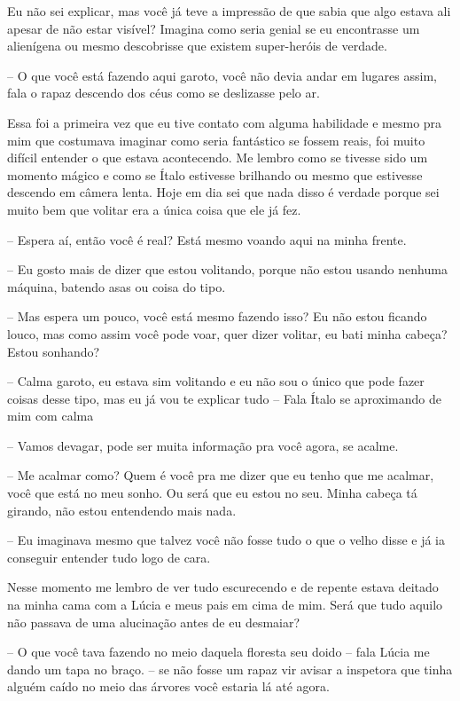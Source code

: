 Eu não sei explicar, mas você já teve a impressão de que sabia que algo estava ali apesar de não estar visível? Imagina como seria genial se eu encontrasse um alienígena ou mesmo descobrisse que existem super-heróis de verdade.

-- O que você está fazendo aqui garoto, você não devia andar em lugares assim, fala o rapaz descendo dos céus como se deslizasse pelo ar.

Essa foi a primeira vez que eu tive contato com alguma habilidade e mesmo pra mim que costumava imaginar como seria fantástico se fossem reais, foi muito difícil entender o que estava acontecendo. Me lembro como se tivesse sido um momento mágico e como se Ítalo estivesse brilhando ou mesmo que estivesse descendo em câmera lenta. Hoje em dia sei que nada disso é verdade porque sei muito bem que volitar era a única coisa que ele já fez.

-- Espera aí, então você é real? Está mesmo voando aqui na minha frente.

-- Eu gosto mais de dizer que estou volitando, porque não estou usando nenhuma máquina, batendo asas ou coisa do tipo.

-- Mas espera um pouco, você está mesmo fazendo isso? Eu não estou ficando louco, mas como assim você pode voar, quer dizer volitar, eu bati minha cabeça? Estou sonhando?

-- Calma garoto, eu estava sim volitando e eu não sou o único que pode fazer coisas desse tipo, mas eu já vou te explicar tudo -- Fala Ítalo se aproximando de mim com calma 

-- Vamos devagar, pode ser muita informação pra você agora, se acalme.

-- Me acalmar como? Quem é você pra me dizer que eu tenho que me acalmar, você que está no meu sonho. Ou será que eu estou no seu. Minha cabeça tá girando, não estou entendendo mais nada.

-- Eu imaginava mesmo que talvez você não fosse tudo o que o velho disse e já ia conseguir entender tudo logo de cara.

Nesse momento me lembro de ver tudo escurecendo e de repente estava deitado na minha cama com a Lúcia e meus pais em cima de mim. Será que tudo aquilo não passava de uma alucinação antes de eu desmaiar?

-- O que você tava fazendo no meio daquela floresta seu doido -- fala Lúcia me dando um tapa no braço. -- se não fosse um rapaz vir avisar a inspetora que tinha alguém caído no meio das árvores você estaria lá até agora.

